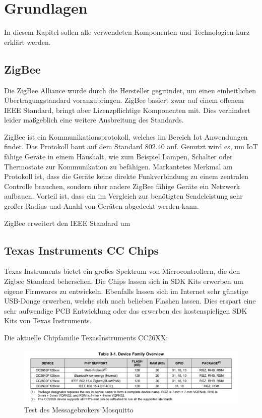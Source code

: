 \chapter{Grundlagen}

In diesem Kapitel sollen alle verwendeten Komponenten und Technologien kurz erklärt werden.
\section{ZigBee}

Die ZigBee Alliance wurde durch die Hersteller  gegründet, um einen einheitlichen Übertragungstandard
voranzubringen. ZigBee basiert zwar auf einem offenem IEEE Standard, bringt aber Lizenzpflichtige Komponenten mit.
Dies verhindert leider maßgeblich eine weitere Ausbreitung des Standards.

ZigBee ist ein Kommunikationsprotokoll, welches im Bereich Iot Anwendungen findet. Das Protokoll baut auf dem Standard
802.40 auf. Genutzt wird es, um IoT fähige Geräte in einem Haushalt, wie zum Beispiel Lampen, Schalter oder Thermostate
zur Kommunikation zu befähigen. Markantetes Merkmal am Protokoll ist, dass die Geräte keine direkte Funkverbindung
zu einem zentralen Controlle brauchen, sondern über andere ZigBee fähige Geräte ein Netzwerk aufbauen. Vorteil ist,
dass ein im Vergleich zur benötigten Sendeleistung sehr großer Radius und Anahl von Geräten abgedeckt werden kann.

ZigBee erweitert den IEEE Standard um 


\section{Texas Instruments CC Chips}

Texas Instruments bietet ein großes Spektrum von Microcontrollern, die den Zigbee Standard beherschen. Die Chips 
lassen sich in SDK Kits erwerben um eigene Firmwares zu entwickeln. Ebenfalls lassen sich im Internet sehr günstige
USB-Donge erwerben, welche sich nach belieben Flashen lassen. Dies erspart eine sehr aufwendige PCB Entwicklung
oder das erwerben des kostenspieligen SDK Kits von Texas Instruments.

Die aktuelle Chipfamilie TexasInstruments CC26XX:

\begin{figure}[H]
  \centering
  \includegraphics[width=1\textwidth]{media/table26xx.png}
  \caption{Test des Messagebrokers Mosquitto}
\end{figure}

